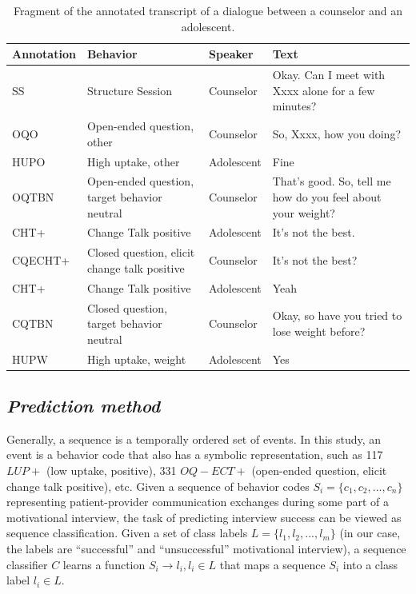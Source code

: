 \documentclass{amia_summit_2018}
\begin{document}
\begin{table}[h]
\caption{Fragment of the annotated transcript of a dialogue between a counselor and an adolescent.}    
\label{tab:anno_examp}
\centering
\begin{tabular}{|l|p{3.2cm}|l|p{8cm}|}
\hline
\bf{Annotation}  & \bf{Behavior} & \bf{Speaker} & \bf{Text} \\\hline
SS & Structure Session & Counselor & Okay. Can I meet with Xxxx alone for a few minutes? \\\hline
OQO & Open-ended question, other & Counselor & So, Xxxx, how you doing? \\\hline
HUPO &	High uptake, other	& Adolescent &	Fine \\\hline
OQTBN &	Open-ended question, target behavior neutral & Counselor &	That's good.  So, tell me  how do you feel about your weight? \\\hline
CHT+ &	Change Talk positive	& Adolescent &	It's not the best. \\\hline
CQECHT+ & Closed question, elicit change talk positive & Counselor & It's not the best? \\\hline
CHT+ &	Change Talk positive &	Adolescent & Yeah \\\hline
CQTBN &	Closed question, target behavior neutral  & Counselor &	Okay, so have you tried to lose weight before? \\\hline
HUPW &	High uptake, weight & Adolescent &	Yes \\\hline
\end{tabular}
\end{table}  

\subsection*{\textit{Prediction method}}
Generally, a sequence is a temporally ordered set of events. In this study, an event is a behavior code that also has a symbolic representation, such as 117 $LUP+$ (low uptake, positive), 331 $OQ-ECT+$ (open-ended question, elicit change talk positive), etc.  Given a sequence of behavior codes $S_i = \{c_1, c_2,...,c_n\}$ representing patient-provider communication exchanges during some part of a motivational interview, the task of predicting interview success can be viewed as sequence classification. Given a set of class labels $L = \{l_1, l_2,...,l_m\}$ (in our case, the labels are ``successful'' and ``unsuccessful'' motivational interview), a sequence classifier $C$ learns a function $S_i \to l_i, l_i \in L$ that maps a sequence $S_i$ into a class label $l_i \in L$.
\end{document}
